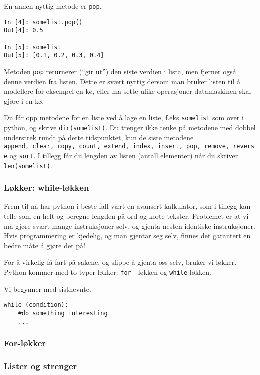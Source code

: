 \documentclass[]{article}
\begin{document}
En annen nyttig metode er \texttt{pop}.

\begin{verbatim}
In [4]: somelist.pop()
Out[4]: 0.5

In [5]: somelist
Out[5]: [0.1, 0.2, 0.3, 0.4]
\end{verbatim}

Metoden \texttt{pop} returnerer (``gir ut'') den siste verdien i lista,
men fjerner også denne verdien fra listen. Dette er svært nyttig dersom
man bruker listen til å modellere for eksempel en kø, eller må sette
ulike operasjoner datamaskinen skal gjøre i en kø.

Du får opp metodene for en liste ved å lage en liste, f.eks
\texttt{somelist} som over i python, og skrive \texttt{dir(somelist)}.
Du trenger ikke tenke på metodene med dobbel understrek rundt på dette
tidspunktet, kun de siste metodene
\texttt{append,\ clear,\ copy,\ count,\ extend,\ index,\ insert,\ pop,\ remove,\ reverse}
og \texttt{sort}. I tillegg får du lengden av listen (antall elementer)
når du skriver \texttt{len(somelist)}.

\subsubsection{Løkker: while-løkken}\label{luxf8kker-while-luxf8kken}

Frem til nå har python i beste fall vært en avansert kalkulator, som i
tillegg kan telle som en helt og beregne lengden på ord og korte
tekster. Problemet er at vi må gjøre svært mange instruksjoner selv, og
gjenta nesten identiske instruksjoner. Hvis programmering er kjedelig,
og man gjentar seg selv, finnes det garantert en bedre måte å gjøre det
på!

For å virkelig få fart på sakene, og slippe å gjenta oss selv, bruker vi
løkker. Python kommer med to typer løkker: \texttt{for} - løkken og
\texttt{while}-løkken.

Vi begynner med sistnevnte.

\begin{verbatim}
while (condition):
    #do something interesting
    ...
\end{verbatim}

\subsubsection{For-løkker}\label{for-luxf8kker}

\subsubsection{Lister og strenger}\label{lister-og-strenger}
\end{document}
